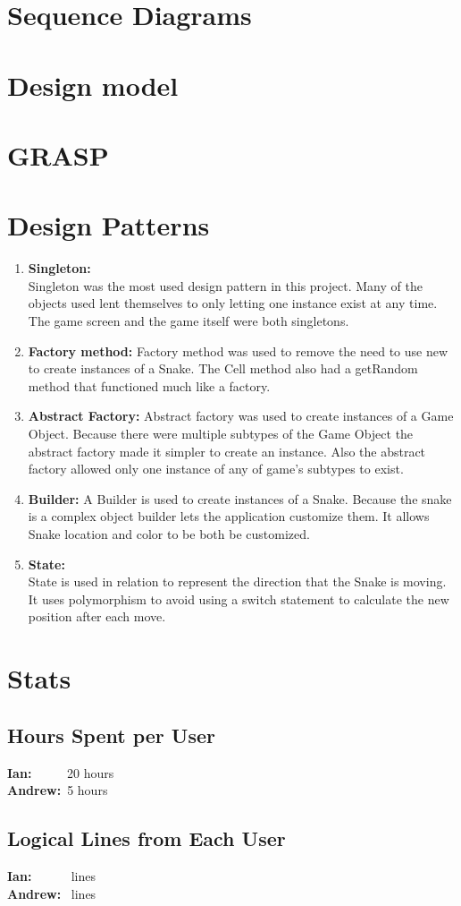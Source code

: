 \documentclass[titlepage]{article}
\begin{document}
	
	
	\section{Sequence Diagrams}
	
	\section{Design model}
	
	\section{GRASP}
	
	\section{Design Patterns}
		\begin{enumerate}
			\item \textbf{Singleton:}\\
				Singleton was the most used design pattern in this project. Many of the objects used lent themselves to only letting one instance exist at any
				time. The game screen and the game itself were both singletons.
			\item \textbf{Factory method:}
				Factory method was used to remove the need to use new to create instances of a Snake. The Cell method also had a getRandom method that functioned much like a factory.
			\item \textbf{Abstract Factory:}
				Abstract factory was used to create instances of a Game Object. Because there were multiple subtypes of the Game Object the abstract factory made it simpler to create an instance. Also the abstract factory allowed only one instance of any of game's subtypes to exist.
			\item \textbf{Builder:}
				A Builder is used to create instances of a Snake. Because the snake is a complex object builder lets the application customize them. It allows Snake location and color to be both be customized.
			\item \textbf{State:}\\
				State is used in relation to represent the direction that the Snake is moving. It uses polymorphism to avoid using a switch statement to calculate the new position after each move.
		\end{enumerate}
	\section{Stats}
	\subsection{Hours Spent per User}
	\textbf{Ian:} ~~~~~20 hours\\
	\textbf{Andrew:}~5 hours
	\subsection{Logical Lines from Each User}
	\textbf{Ian:} ~~~~~ lines\\
	\textbf{Andrew:}~ lines
\end{document}
